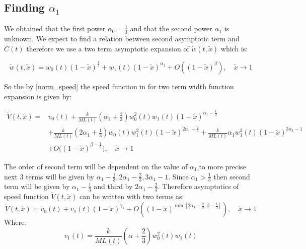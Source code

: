 \subsection{Finding $\alpha_1$}

We obtained that the first power $\alpha_{0}=\frac{1}{3}$ and that
the second power $\alpha_{1}$ is unknown. We expect to find a relation
between second asymptotic term and $C(t)$ therefore we use a two
term asymptotic expansion of $\tilde{w}(t,\tilde{x})$ which is:

\begin{equation}
\tilde{w}(t,\tilde{x})=w_{0}(t)(1-\tilde{x})^{\frac{1}{3}}+w_{1}(t)(1-\tilde{x})^{\alpha_{1}}+O\left((1-\tilde{x})^{\beta}\right),\quad\tilde{x}\to1\label{w_two_term}
\end{equation}

So the by \eqref{norm_speed} the speed function in for two term width function expansion is given by:

\begin{equation}
\begin{split}\tilde{V}(t,\tilde{x})=& v_0(t)+\frac{k}{ML(t)}\left(\alpha_{1}+\frac{2}{3}\right)w_{0}^{2}(t)w_{1}(t)\left(1-\tilde{x}\right)^{\alpha_{1}-\frac{1}{3}}\\
 & +\frac{k}{ML(t)}\left(2\alpha_{1}+\frac{1}{3}\right)w_{0}(t)w_{1}^{2}(t)\left(1-\tilde{x}\right)^{2\alpha_{1}-\frac{2}{3}}+\frac{k}{ML(t)}\alpha_{1}w_{1}^{3}(t)\left(1-\tilde{x}\right)^{3\alpha_{1}-1}\\
 & +O\big(\left(1-\tilde{x}\right)^{\beta-\frac{1}{3}}\big),\quad\tilde{x}\to1
\end{split}
\label{v_two_term}
\end{equation}

The order of second term will be dependent on the value of $\alpha_{1}$,to more precise next 3 terms will be given by $\alpha_{1}-\frac{1}{3},2\alpha_{1}-\frac{2}{3},3\alpha_{1}-1$. Since $\alpha_{1}>\frac{1}{3}$ then second term will be given by $\alpha_{1}-\frac{1}{3}$ and third by $2\alpha_{1}-\frac{2}{3}$. Therefore asymptotics of speed function $\tilde{V}(t,\tilde{x})$ can be written with two terms as:  
\begin{equation}
\tilde{V}(t,\tilde{x})=v_{0}(t)+v_{1}(t)(1-\tilde{x})^{\gamma_{1}}+O\left((1-\tilde{x})^{\min[2\alpha_{1}-\frac{2}{3},\beta-\frac{1}{3}]}\right),\quad\tilde{x}\to1
\end{equation}
Where: 
\begin{equation}
v_{1}(t)=\frac{k}{ML(t)}\left(\alpha+\frac{2}{3}\right)w_{0}^{2}(t)w_{1}(t)\label{v_1}
\end{equation}

